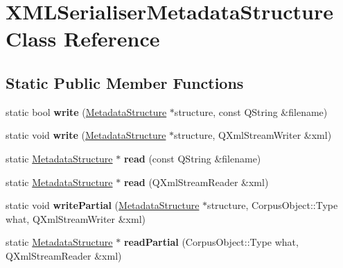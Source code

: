 \hypertarget{class_x_m_l_serialiser_metadata_structure}{}\section{X\+M\+L\+Serialiser\+Metadata\+Structure Class Reference}
\label{class_x_m_l_serialiser_metadata_structure}
\subsection*{Static Public Member Functions}
\begin{DoxyCompactItemize}
\item 
\mbox{\label{class_x_m_l_serialiser_metadata_structure_afaf18f4ab18be6a3046fbeab89811c58}} 
static bool {\bfseries write} (\hyperlink{class_metadata_structure}{Metadata\+Structure} $\ast$structure, const Q\+String \&filename)
\item 
\mbox{\label{class_x_m_l_serialiser_metadata_structure_adb49b9dc0491ba31dbb834e3ccf62e3f}} 
static void {\bfseries write} (\hyperlink{class_metadata_structure}{Metadata\+Structure} $\ast$structure, Q\+Xml\+Stream\+Writer \&xml)
\item 
\mbox{\label{class_x_m_l_serialiser_metadata_structure_a3984867fcf36d937cd8e1d1b990d5d64}} 
static \hyperlink{class_metadata_structure}{Metadata\+Structure} $\ast$ {\bfseries read} (const Q\+String \&filename)
\item 
\mbox{\label{class_x_m_l_serialiser_metadata_structure_a17632f99a101cc52a33c3aa4bd7b4335}} 
static \hyperlink{class_metadata_structure}{Metadata\+Structure} $\ast$ {\bfseries read} (Q\+Xml\+Stream\+Reader \&xml)
\item 
\mbox{\label{class_x_m_l_serialiser_metadata_structure_ae5be192c33d69b964d7972b8164d5930}} 
static void {\bfseries write\+Partial} (\hyperlink{class_metadata_structure}{Metadata\+Structure} $\ast$structure, Corpus\+Object\+::\+Type what, Q\+Xml\+Stream\+Writer \&xml)
\item 
\mbox{\label{class_x_m_l_serialiser_metadata_structure_a1c7e4a02f769f1f55f684aa6b436b686}} 
static \hyperlink{class_metadata_structure}{Metadata\+Structure} $\ast$ {\bfseries read\+Partial} (Corpus\+Object\+::\+Type what, Q\+Xml\+Stream\+Reader \&xml)
\end{DoxyCompactItemize}


